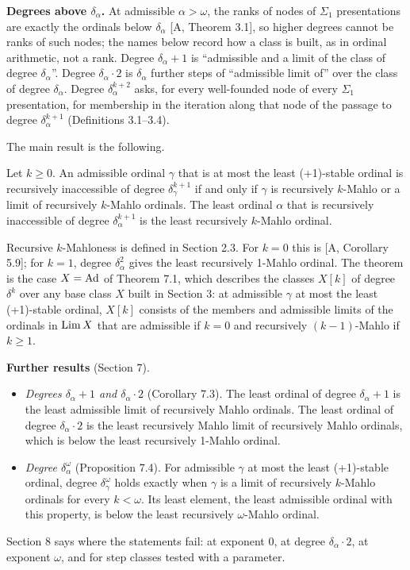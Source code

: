 \documentclass[11pt]{article}
\begin{document}
\textbf{Degrees above $\delta_\alpha$.} At admissible $\alpha > \omega$, the ranks of nodes of $\Sigma_1$ presentations are exactly
the ordinals below $\delta_\alpha$ [A, Theorem 3.1], so higher degrees cannot be ranks of such nodes; the names below record
how a class is built, as in ordinal arithmetic, not a rank. Degree $\delta_\alpha + 1$ is ``admissible and a limit of
the class of degree $\delta_\alpha$''. Degree $\delta_\alpha \cdot 2$ is $\delta_\alpha$ further steps of ``admissible
limit of'' over the class of degree $\delta_\alpha$. Degree $\delta_\alpha^{k+2}$ asks, for every well-founded node of
every $\Sigma_1$ presentation, for membership in the iteration along that node of the passage to degree
$\delta_\alpha^{k+1}$ (Definitions 3.1--3.4).

The main result is the following.

\begin{statement} Let $k \ge 0$. An admissible ordinal $\gamma$ that is at most
the least (+1)-stable ordinal is recursively inaccessible of degree $\delta_\gamma^{k+1}$ if and only if $\gamma$ is
recursively $k$-Mahlo or a limit of recursively $k$-Mahlo ordinals. The least ordinal $\alpha$ that is recursively
inaccessible of degree $\delta_\alpha^{k+1}$ is the least recursively $k$-Mahlo ordinal.
\end{statement}

Recursive $k$-Mahloness is defined in Section 2.3. For
$k = 0$ this is [A, Corollary 5.9]; for $k = 1$, degree $\delta_\alpha^2$ gives the least recursively 1-Mahlo ordinal.
The theorem is the case $X = \mathrm{Ad}$ of Theorem 7.1, which describes the classes $X[k]$ of degree $\delta^k$ over any base
class $X$ built in Section 3: at admissible $\gamma$ at most the least (+1)-stable ordinal, $X[k]$ consists of the members and admissible
limits of the ordinals in $\mathrm{Lim}\, X$ that are admissible if $k = 0$ and recursively $(k-1)$-Mahlo if $k \ge 1$.

\textbf{Further results} (Section 7).
\begin{itemize}
\item \emph{Degrees $\delta_\alpha + 1$ and $\delta_\alpha \cdot 2$} (Corollary 7.3). The least ordinal of degree
  $\delta_\alpha + 1$ is the least admissible limit of recursively Mahlo ordinals. The least ordinal of degree
  $\delta_\alpha \cdot 2$ is the least recursively Mahlo limit of recursively Mahlo ordinals, which is below the least
  recursively 1-Mahlo ordinal.
\item \emph{Degree $\delta_\alpha^\omega$} (Proposition 7.4). For admissible $\gamma$ at most the least (+1)-stable ordinal, degree
  $\delta_\gamma^\omega$ holds exactly when $\gamma$ is a limit of recursively $k$-Mahlo ordinals for every $k <
  \omega$. Its least element, the least admissible ordinal with this property, is below the least recursively
  $\omega$-Mahlo ordinal.
\end{itemize}
Section 8 says where the statements fail: at exponent $0$, at degree $\delta_\alpha \cdot 2$, at exponent $\omega$, and
for step classes tested with a parameter.
\end{document}
